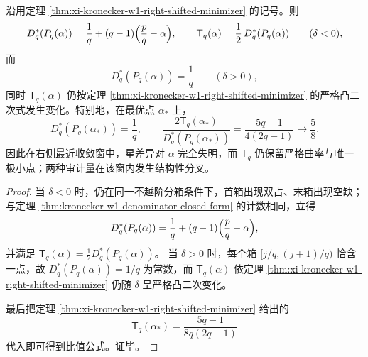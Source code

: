 \begin{corollary}\label{cor:xi-kronecker-star-discrepancy-w1-branching}
沿用定理 \ref{thm:xi-kronecker-w1-right-shifted-minimizer} 的记号。则
\[
D_q^\ast(P_q(\alpha))
=
\frac{1}{q}+(q-1)\Bigl(\frac{p}{q}-\alpha\Bigr),
\qquad
\mathsf{T}_q(\alpha)=\frac12\,D_q^\ast(P_q(\alpha))
\qquad(\delta<0),
\]
而
\[
D_q^\ast(P_q(\alpha))=\frac{1}{q}
\qquad(\delta>0),
\]
同时 \(\mathsf{T}_q(\alpha)\) 仍按定理 \ref{thm:xi-kronecker-w1-right-shifted-minimizer} 的严格凸二次式发生变化。特别地，在最优点 \(\alpha_*\) 上，
\[
D_q^\ast(P_q(\alpha_*))=\frac{1}{q},
\qquad
\frac{2\mathsf{T}_q(\alpha_*)}{D_q^\ast(P_q(\alpha_*))}
=
\frac{5q-1}{4(2q-1)}
\longrightarrow \frac{5}{8}.
\]
因此在右侧最近收敛窗中，星差异对 \(\alpha\) 完全失明，而 \(\mathsf{T}_q\) 仍保留严格曲率与唯一极小点；两种审计量在该窗内发生结构性分叉。
\end{corollary}
\begin{proof}
当 \(\delta<0\) 时，仍在同一不越阶分箱条件下，首箱出现双占、末箱出现空缺；与定理 \ref{thm:kronecker-w1-denominator-closed-form} 的计数相同，立得
\[
D_q^\ast(P_q(\alpha))
=
\frac{1}{q}+(q-1)\Bigl(\frac{p}{q}-\alpha\Bigr),
\]
并满足 \(\mathsf{T}_q(\alpha)=\tfrac12 D_q^\ast(P_q(\alpha))\)。
当 \(\delta>0\) 时，每个箱 \([j/q,(j+1)/q)\) 恰含一点，故
\(
D_q^\ast(P_q(\alpha))=1/q
\)
为常数，而 \(\mathsf{T}_q(\alpha)\) 依定理 \ref{thm:xi-kronecker-w1-right-shifted-minimizer} 仍随 \(\delta\) 呈严格凸二次变化。

最后把定理 \ref{thm:xi-kronecker-w1-right-shifted-minimizer} 给出的
\[
\mathsf{T}_q(\alpha_*)=\frac{5q-1}{8q(2q-1)}
\]
代入即可得到比值公式。证毕。
\end{proof}

